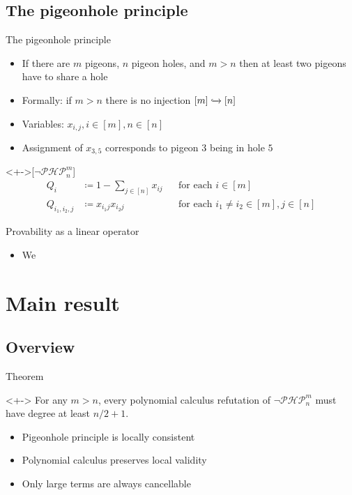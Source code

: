 \documentclass[xcolor={dvipsnames}, aspectratio=169, handout]{beamer}
\newcommand{\PHP}{\ensuremath{\neg \mathcal{PHP}^m_n}\xspace}
\newcommand{\Qiij}{Q_{i_1, i_2, j}}
\begin{document}
\subsection{The pigeonhole principle}
\begin{frame}{The pigeonhole principle}
    \begin{itemize}[<+->]
        \item If there are $m$ pigeons, $n$ pigeon holes, and $m > n$ then at least two pigeons have to share a hole
        \item Formally: if $m > n$ there is no injection $[m] \xhookrightarrow{} [n]$
        \item Variables: $x_{i, j}, i \in [m], n \in [n]$
        \item Assignment of $x_{3, 5}$ corresponds to pigeon $3$ being in hole $5$
    \end{itemize}
    \begin{definition}<+->[\PHP]
        \begin{align*}
            Q_i &\coloneqq 1 - \sum_{j \in [n]} x_{ij} &&\text{for each $i \in [m]$}\\
            \Qiij &\coloneqq x_{i_1j} x_{i_2j} &&\text{for each $i_1 \neq i_2 \in [m], j \in [n]$}
        \end{align*}
    \end{definition}
\end{frame}

\begin{frame}{Provability as a linear operator}
    \begin{itemize}[<+->]
        \item We 
    \end{itemize}
\end{frame}

\section{Main result}
\subsection{Overview}
\begin{frame}{Theorem}
    \begin{theorem}<+->
        For any $m > n$, every polynomial calculus refutation of \PHP must have degree at least $n/2 + 1$.
    \end{theorem}
    \begin{itemize}[<+->]
        \item Pigeonhole principle is locally consistent
        \item Polynomial calculus preserves local validity
        \item Only large terms are always cancellable
    \end{itemize}
\end{frame}
\end{document}
